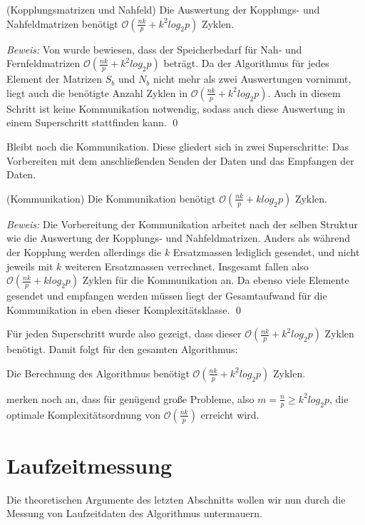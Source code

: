   \begin{lem}
  \label{lem:koppl}
    (Kopplungsmatrizen und Nahfeld)
    Die Auswertung der Kopplungs- und Nahfeldmatrizen benötigt $\mathcal{O}(\frac{nk}{p} + k^2 log_2p)$ Zyklen.
  \end{lem}

  \textit{Beweis:}
  Von \citet{distrh2} wurde bewiesen, dass der Speicherbedarf für Nah- und Fernfeldmatrizen $\mathcal{O}(\frac{nk}{p} + k^2 log_2p)$ beträgt. Da der Algorithmus für jedes Element der Matrizen $S_b$ und
  $N_b$ nicht mehr als zwei Auswertungen vornimmt, liegt auch die benötigte Anzahl Zyklen in $\mathcal{O}(\frac{nk}{p} + k^2 log_2p)$. Auch in diesem Schritt ist keine Kommunikation notwendig, sodass 
  auch diese Auswertung in einem Superschritt stattfinden kann. \qed
  
  Bleibt noch die Kommunikation. Diese gliedert sich in zwei Superschritte: Das Vorbereiten mit dem anschließenden Senden der Daten und das Empfangen der Daten. 
  
  \begin{lem}
    (Kommunikation)
    Die Kommunikation benötigt $\mathcal{O}(\frac{nk}{p} + k log_2p)$ Zyklen.
  \end{lem}

  \textit{Beweis:}
  Die Vorbereitung der Kommunikation arbeitet nach der selben Struktur wie die Auswertung der Kopplungs- und Nahfeldmatrizen. Anders als während der Kopplung werden allerdings die $k$ Ersatzmassen
  lediglich gesendet, und nicht jeweils mit $k$ weiteren Ersatzmassen verrechnet. Insgesamt fallen also $\mathcal{O}(\frac{nk}{p} + k log_2p)$ Zyklen für die Kommunikation
  an. Da ebenso viele Elemente gesendet und empfangen werden müssen liegt der Gesamtaufwand für die Kommunikation in eben dieser Komplexitätsklasse. \qed
  
  Für jeden Superschritt wurde also gezeigt, dass dieser $\mathcal{O}(\frac{nk}{p} + k^2 log_2p)$ Zyklen benötigt. Damit folgt für den gesamten Algorithmus:
  
  \begin{thm}
    Die Berechnung des Algorithmus benötigt $\mathcal{O}(\frac{nk}{p} + k^2 log_2p)$ Zyklen.
  \end{thm}
  
  \citet{distrh2} merken noch an, dass  für genügend große Probleme, also $m = \frac{n}{p} \geq k^2 log_2p$, die optimale Komplexitätsordnung von $\mathcal{O}(\frac{nk}{p})$ erreicht wird.
  
  \section{Laufzeitmessung}
  \label{sec:lauf}
  Die theoretischen Argumente des letzten Abschnitts wollen wir nun durch die Messung von Laufzeitdaten des Algorithmus untermauern.
  
